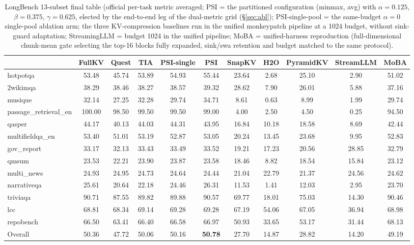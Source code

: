 \documentclass[11pt]{article}
\begin{document}
\begin{table}[h]\centering
\small
\caption{LongBench 13-subset final table (official per-task metric averaged; PSI = the partitioned configuration (minmax, avg) with $\alpha{=}0.125$, $\beta{=}0.375$, $\gamma{=}0.625$, elected by the end-to-end leg of the dual-metric grid (\S\ref{sec:abl}); PSI-single-pool = the same-budget $\alpha{=}0$ single-pool ablation arm; the three KV-compression baselines run in the unified monkeypatch pipeline at a 1024 budget, without sink-guard adaptation; StreamingLLM = budget 1024 in the unified pipeline; MoBA = unified-harness reproduction (full-dimensional chunk-mean gate selecting the top-16 blocks fully expanded, sink/swa retention and budget matched to the same protocol).}
\label{tab:longbench}
\small\setlength{\tabcolsep}{1.5pt}
\begin{tabular}{lcccccccccc}
\toprule
 & FullKV & Quest & TIA & PSI-single & PSI & SnapKV & H2O & PyramidKV & StreamLLM & MoBA \\

\midrule
hotpotqa & 53.48 & 45.74 & 53.89 & 54.93 & 55.44 & 23.64 & 2.68 & 25.10 & 2.90 & 51.02 \\
2wikimqa & 38.29 & 38.46 & 38.27 & 38.57 & 39.32 & 28.62 & 7.90 & 26.01 & 5.88 & 37.16 \\
musique & 32.14 & 27.25 & 32.28 & 29.74 & 34.71 & 8.61 & 0.63 & 8.99 & 1.99 & 29.74 \\
passage\_retrieval\_en & 100.00 & 98.50 & 99.50 & 99.50 & 99.00 & 4.00 & 2.50 & 4.50 & 0.25 & 94.50 \\
qasper & 44.17 & 40.13 & 44.03 & 44.31 & 43.95 & 16.84 & 10.18 & 18.58 & 8.69 & 42.44 \\
multifieldqa\_en & 53.40 & 51.01 & 53.19 & 52.87 & 53.05 & 20.24 & 13.45 & 23.68 & 9.95 & 52.83 \\
gov\_report & 33.17 & 32.13 & 33.43 & 33.49 & 33.52 & 19.21 & 17.23 & 20.56 & 28.85 & 32.79 \\
qmsum & 23.53 & 22.21 & 23.90 & 23.87 & 23.58 & 18.46 & 8.82 & 18.54 & 15.84 & 23.12 \\
multi\_news & 24.93 & 24.95 & 24.73 & 24.64 & 24.44 & 21.04 & 22.79 & 21.37 & 24.56 & 24.62 \\
narrativeqa & 25.61 & 20.64 & 22.18 & 24.46 & 26.31 & 11.53 & 1.41 & 12.03 & 2.95 & 23.70 \\
triviaqa & 90.71 & 87.55 & 89.82 & 89.88 & 90.57 & 69.77 & 18.01 & 75.03 & 14.30 & 90.46 \\
lcc & 68.81 & 68.34 & 69.14 & 69.28 & 69.28 & 67.19 & 54.06 & 67.05 & 36.94 & 68.98 \\
repobench & 66.50 & 63.41 & 66.40 & 66.58 & 66.97 & 50.93 & 33.65 & 53.17 & 31.44 & 68.13 \\
Overall & 50.36 & 47.72 & 50.06 & 50.16 & \textbf{50.78} & 27.70 & 14.87 & 28.82 & 14.20 & 49.19 \\
\bottomrule
\end{tabular}
\end{table}
\end{document}
